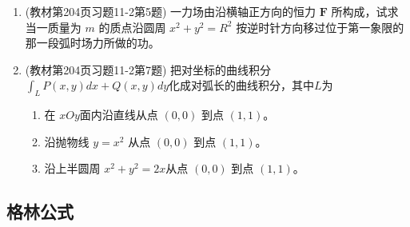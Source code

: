 \begin{enumerate}
\item (教材第204页习题11-2第5题) 一力场由沿横轴正方向的恒力 $\mathbf{F}$ 所构成，试求当一质量为 $m$ 的质点沿圆周 $x^2 + y^2 =R^2$ 按逆时针方向移过位于第一象限的那一段弧时场力所做的功。

\item (教材第204页习题11-2第7题) 把对坐标的曲线积分 $\int _L P(x,y) dx + Q(x,y) dy$化成对弧长的曲线积分，其中$L$为
    \begin{enumerate}[(1)]
        \item 在 $xOy$面内沿直线从点 $(0,0)$ 到点 $(1,1)$。
        \item 沿抛物线 $y=x^2$ 从点 $(0,0)$ 到点 $(1,1)$。
        \item 沿上半圆周 $x^2 + y^2 = 2x$从点 $(0,0)$ 到点 $(1,1)$。
    \end{enumerate}

\end{enumerate}
\subsection{格林公式}
